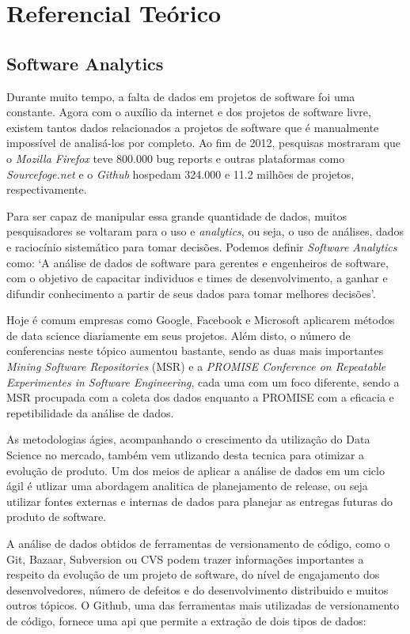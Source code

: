 \chapter{Referencial Teórico}
\section{Software Analytics}
Durante muito tempo, a falta de dados em projetos de software foi uma constante.
Agora com o auxílio da internet e dos projetos de software livre, existem tantos
dados relacionados a projetos de software que é manualmente impossível de analisá-los
por completo\cite{artAndScience}. Ao fim de 2012, pesquisas mostraram que o \textit{Mozilla Firefox} 
teve 800.000 bug reports e outras plataformas como \textit{Sourcefoge.net}
e o \textit{Github} hospedam 324.000 e 11.2 milhões de projetos, respectivamente\cite{informationNeeds}.

Para ser capaz de manipular essa grande quantidade de dados, muitos pesquisadores
se voltaram para o uso e \textit{analytics}, ou seja, o uso de análises, dados e
raciocínio sistemático para tomar decisões. Podemos definir \textit{Software Analytics}
como: `A análise de dados de software para gerentes e engenheiros de software, 
com o objetivo de capacitar individuos e times de desenvolvimento, a ganhar e difundir 
conhecimento a partir de seus dados para tomar melhores decisões'\cite{informationNeeds}.

Hoje é comum empresas como Google, Facebook e Microsoft aplicarem métodos de data
science diariamente em seus projetos. Além disto, o número de conferencias neste
tópico aumentou bastante, sendo as duas mais importantes \textit{Mining Software
Repositories} (MSR) e a \textit{PROMISE Conference on Repeatable Experimentes in Software
Engineering}, cada uma com um foco diferente, sendo a MSR procupada com a coleta dos dados
enquanto a PROMISE com a eficacia e repetibilidade da análise de dados.

As metodologias ágies, acompanhando o crescimento da utilização do Data Science no
mercado, também vem utlizando desta tecnica para otimizar a evolução de produto. Um
dos meios de aplicar a análise de dados em um ciclo ágil é utlizar uma abordagem 
analitica de planejamento de release, ou seja utilizar fontes externas e internas
de dados para planejar as entregas futuras do produto de software. 

A análise de dados obtidos de ferramentas de versionamento de código, como o Git,
Bazaar, Subversion ou CVS podem trazer informações importantes a respeito da evolução
de um projeto de software, do nível de engajamento dos desenvolvedores, número de defeitos
e do desenvolvimento distribuido e muitos outros tópicos\cite{artAndScience}. O Github,
uma das ferramentas mais utilizadas de versionamento de código, fornece uma api que permite
a extração de dois tipos de dados:

